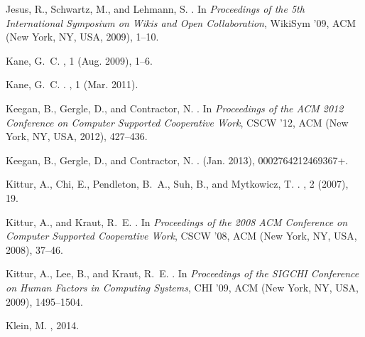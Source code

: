 \begin{thebibliography}{10}
Jesus, R., Schwartz, M., and Lehmann, S.
.
\newblock In {\em Proceedings of the 5th International Symposium on Wikis and
  Open Collaboration}, WikiSym '09, ACM (New York, NY, USA, 2009), 1--10.

Kane, G.~C.
, 1 (Aug. 2009), 1--6.

Kane, G.~C.
.
, 1 (Mar. 2011).

Keegan, B., Gergle, D., and Contractor, N.
.
\newblock In {\em Proceedings of the ACM 2012 Conference on Computer Supported
  Cooperative Work}, CSCW '12, ACM (New York, NY, USA, 2012), 427--436.

Keegan, B., Gergle, D., and Contractor, N.
.
 (Jan. 2013), 0002764212469367+.

Kittur, A., Chi, E., Pendleton, B.~A., Suh, B., and Mytkowicz, T.
.
, 2 (2007), 19.

Kittur, A., and Kraut, R.~E.
.
\newblock In {\em Proceedings of the 2008 ACM Conference on Computer Supported
  Cooperative Work}, CSCW '08, ACM (New York, NY, USA, 2008), 37--46.

Kittur, A., Lee, B., and Kraut, R.~E.
.
\newblock In {\em Proceedings of the SIGCHI Conference on Human Factors in
  Computing Systems}, CHI '09, ACM (New York, NY, USA, 2009), 1495--1504.

Klein, M.
, 2014.


\end{thebibliography}
